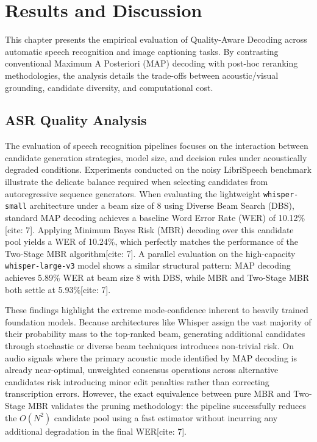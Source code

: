 \chapter{Results and Discussion}
\label{chapter:results_and_discussion}

This chapter presents the empirical evaluation of Quality-Aware Decoding across automatic speech recognition and image captioning tasks. By contrasting conventional Maximum A Posteriori (MAP) decoding with post-hoc reranking methodologies, the analysis details the trade-offs between acoustic/visual grounding, candidate diversity, and computational cost.

\section{ASR Quality Analysis}
\label{sec:asr_quality_analysis}

The evaluation of speech recognition pipelines focuses on the interaction between candidate generation strategies, model size, and decision rules under acoustically degraded conditions. Experiments conducted on the noisy LibriSpeech benchmark illustrate the delicate balance required when selecting candidates from autoregressive sequence generators. When evaluating the lightweight \texttt{whisper-small} architecture under a beam size of 8 using Diverse Beam Search (DBS), standard MAP decoding achieves a baseline Word Error Rate (WER) of 10.12\%[cite: 7]. Applying Minimum Bayes Risk (MBR) decoding over this candidate pool yields a WER of 10.24\%, which perfectly matches the performance of the Two-Stage MBR algorithm[cite: 7]. A parallel evaluation on the high-capacity \texttt{whisper-large-v3} model shows a similar structural pattern: MAP decoding achieves 5.89\% WER at beam size 8 with DBS, while MBR and Two-Stage MBR both settle at 5.93\%[cite: 7]. 

These findings highlight the extreme mode-confidence inherent to heavily trained foundation models. Because architectures like Whisper assign the vast majority of their probability mass to the top-ranked beam, generating additional candidates through stochastic or diverse beam techniques introduces non-trivial risk. On audio signals where the primary acoustic mode identified by MAP decoding is already near-optimal, unweighted consensus operations across alternative candidates risk introducing minor edit penalties rather than correcting transcription errors. However, the exact equivalence between pure MBR and Two-Stage MBR validates the pruning methodology: the pipeline successfully reduces the $O(N^2)$ candidate pool using a fast estimator without incurring any additional degradation in the final WER[cite: 7].

